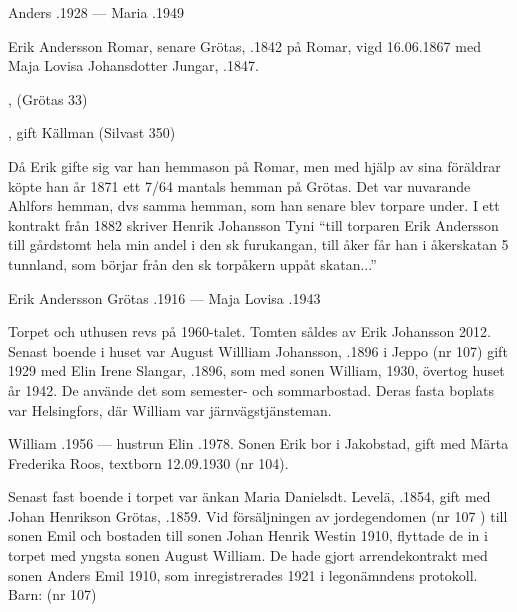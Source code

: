 Anders .1928  ---  Maria .1949


Erik Andersson Romar, senare Grötas, .1842 på Romar, vigd 16.06.1867 med Maja Lovisa Johansdotter Jungar, .1847.
\begin{jhchildren}
  \item {}, (Grötas 33)
  \item {}
  \item {}, gift Källman (Silvast 350)
\end{jhchildren}

Då Erik gifte sig var han hemmason på Romar, men med hjälp av sina föräldrar köpte han år 1871 ett 7/64 mantals hemman på Grötas. Det var nuvarande Ahlfors hemman, dvs samma hemman, som han senare blev torpare under. I ett kontrakt från 1882 skriver Henrik Johansson Tyni ``till torparen Erik Andersson till gårdstomt hela min andel i den sk furukangan, till åker får han i åkerskatan 5 tunnland, som börjar från den sk torpåkern uppåt skatan...''

Erik Andersson Grötas .1916  ---  Maja Lovisa .1943






Torpet och uthusen revs på 1960-talet. Tomten såldes av Erik Johansson 2012. Senast boende i huset var August Willliam Johansson, .1896 i Jeppo (nr 107) gift 1929 med Elin Irene Slangar, .1896, som med sonen William,  1930, övertog huset år 1942. De använde det som semester- och sommarbostad. Deras fasta boplats var Helsingfors, där William var järnvägstjänsteman.

William .1956  ---  hustrun Elin .1978.
Sonen Erik bor i Jakobstad, gift med Märta Frederika Roos, textborn 12.09.1930 (nr 104).


Senast fast boende i torpet var änkan Maria Danielsdt. Levelä, .1854, gift med Johan Henrikson Grötas, .1859. Vid försäljningen av jordegendomen (nr 107 ) till sonen Emil och bostaden till sonen Johan Henrik Westin 1910, flyttade de in i torpet med yngsta sonen August William. De hade gjort arrendekontrakt med sonen Anders Emil 1910, som inregistrerades 1921 i legonämndens protokoll.  Barn: (nr 107)

